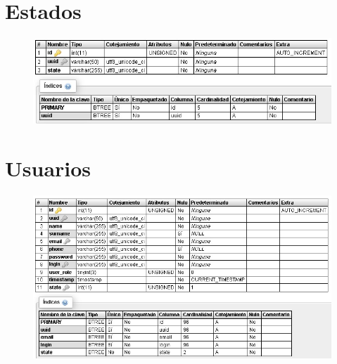 \pagebreak



\section{Estados}
\begin{figure}[h]
\centering
\includegraphics[width=1\textwidth]{Img/Disenyo/BD_STATE_TYPES.jpg}
\end{figure}

\section{Usuarios}
\begin{figure}[h]
\centering
\includegraphics[width=1\textwidth]{Img/Disenyo/BD_USERS.jpg}
\end{figure}